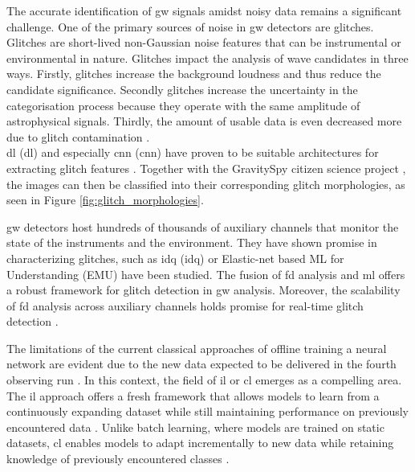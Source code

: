 The accurate identification of \acrshort{gw} signals amidst noisy data remains a significant challenge. One of the primary sources of noise in \acrshort{gw} detectors are glitches. 
Glitches are short-lived non-Gaussian noise features that can be instrumental or environmental in nature. Glitches impact the analysis of wave candidates in three ways. Firstly, glitches increase the background loudness and thus reduce the candidate significance. Secondly glitches increase the uncertainty in the categorisation process because they operate with the same amplitude of astrophysical signals. Thirdly, the amount of usable data is even decreased more due to glitch contamination \citep{zevin2017gravity, cuoco2020enhancing}. \\
\acrlong{dl} (\acrshort{dl}) and especially \acrlong{cnn} (\acrshort{cnn}) have proven to be suitable architectures for extracting glitch features \citep{george2017deep,glanzer2023data,fernandes2023convolutional}. Together with the GravitySpy citizen science project \citep{bahaadini2018machine, zevin2017gravity}, the images can then be classified into their corresponding glitch morphologies, as seen in Figure \ref{fig:glitch_morphologies}.

\acrshort{gw} detectors host hundreds of thousands of auxiliary channels that monitor the state of the instruments and the environment. They have shown promise in characterizing glitches, such as \acrlong{idq} (\acrshort{idq}) \citep{essick2020idq,davis2022detector} or Elastic-net based ML for Understanding (EMU) \citep{colgan2020efficient} have been studied. The fusion of \acrfull{fd} analysis and \acrshort{ml} offers a robust framework for glitch detection in \acrshort{gw} analysis. Moreover, the scalability of \acrshort{fd} analysis across auxiliary channels holds promise for real-time glitch detection \citep{colgan2020efficient, benedetto2023ai}.

The limitations of the current classical approaches of offline training a neural network are evident due to the new data expected to be delivered in the fourth observing run \citep{wu2024advancing}. In this context, the field of \acrfull{il} or \acrfull{cl} emerges as a compelling area. The \acrshort{il} approach offers a fresh framework that allows models to learn from a continuously expanding dataset while still maintaining performance on previously encountered data \citep{van2022three, qu2021recent, de2021continual}.
Unlike batch learning, where models are trained on static datasets, \acrshort{cl} enables models to adapt incrementally to new data while retaining knowledge of previously encountered classes \citep{kirkpatrick2017overcoming}. 

